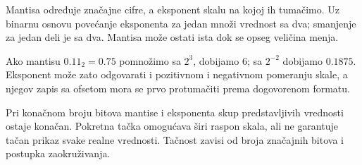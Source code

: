 
Mantisa određuje značajne cifre, a eksponent skalu na kojoj ih tumačimo. Uz binarnu osnovu povećanje eksponenta za jedan množi vrednost sa dva; smanjenje za jedan deli je sa dva. Mantisa može ostati ista dok se opseg veličina menja.

Ako mantisu $0.11_2=0.75$ pomnožimo sa $2^3$, dobijamo $6$; sa $2^{-2}$ dobijamo $0.1875$. Eksponent može zato odgovarati i pozitivnom i negativnom pomeranju skale, a njegov zapis sa ofsetom mora se prvo protumačiti prema dogovorenom formatu.

Pri konačnom broju bitova mantise i eksponenta skup predstavljivih vrednosti ostaje konačan. Pokretna tačka omogućava širi raspon skala, ali ne garantuje tačan prikaz svake realne vrednosti. Tačnost zavisi od broja značajnih bitova i postupka zaokruživanja.
